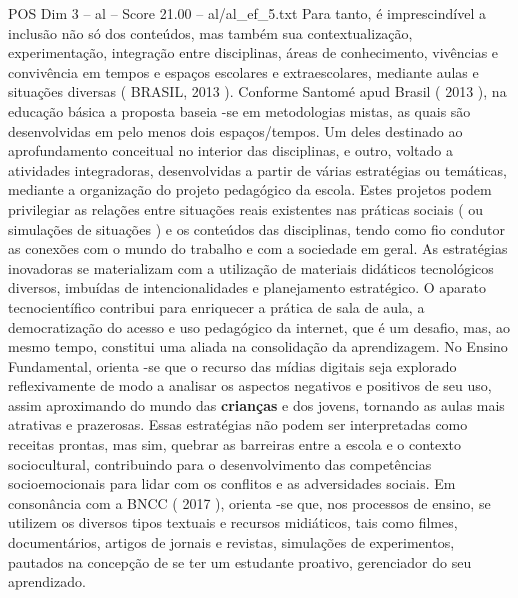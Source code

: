 \begin{textsample}{POS Dim 3 – al – Score 21.00 – al/al\_ef\_5.txt}
Para tanto, é imprescindível a inclusão não só dos conteúdos, mas também sua contextualização, experimentação, integração entre disciplinas, áreas de conhecimento, vivências e convivência em tempos e espaços escolares e extraescolares, mediante aulas e situações diversas ( BRASIL, 2013 ).
Conforme Santomé apud Brasil ( 2013 ), na educação básica a proposta baseia -se em metodologias mistas, as quais são desenvolvidas em pelo menos dois espaços/tempos.
Um deles destinado ao aprofundamento conceitual no interior das disciplinas, e outro, voltado a atividades integradoras, desenvolvidas a partir de várias estratégias ou temáticas, mediante a organização do projeto pedagógico da escola.
Estes projetos podem privilegiar as relações entre situações reais existentes nas práticas sociais ( ou simulações de situações ) e os conteúdos das disciplinas, tendo como fio condutor as conexões com o mundo do trabalho e com a sociedade em geral.
As estratégias inovadoras se materializam com a utilização de materiais didáticos tecnológicos diversos, imbuídas de intencionalidades e planejamento estratégico.
O aparato tecnocientífico contribui para enriquecer a prática de sala de aula, a democratização do acesso e uso pedagógico da internet, que é um desafio, mas, ao mesmo tempo, constitui uma aliada na consolidação da aprendizagem.
No Ensino Fundamental, orienta -se que o recurso das mídias digitais seja explorado reflexivamente de modo a analisar os aspectos negativos e positivos de seu uso, assim aproximando do mundo das \textbf{crianças} e dos jovens, tornando as aulas mais atrativas e prazerosas.
Essas estratégias não podem ser interpretadas como receitas prontas, mas sim, quebrar as barreiras entre a escola e o contexto sociocultural, contribuindo para o desenvolvimento das competências socioemocionais para lidar com os conflitos e as adversidades sociais.
Em consonância com a BNCC ( 2017 ), orienta -se que, nos processos de ensino, se utilizem os diversos tipos textuais e recursos midiáticos, tais como filmes, documentários, artigos de jornais e revistas, simulações de experimentos, pautados na concepção de se ter um estudante proativo, gerenciador do seu aprendizado.

\end{textsample}
